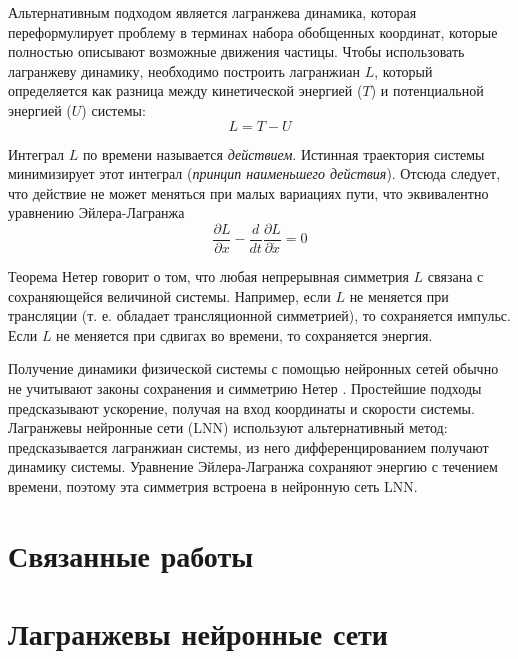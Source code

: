 \documentclass[12pt]{article}
\begin{document}
	Альтернативным подходом является лагранжева динамика, которая переформулирует  проблему в терминах набора обобщенных координат, которые полностью описывают возможные движения частицы. Чтобы использовать лагранжеву динамику, необходимо построить лагранжиан $L$, который определяется как разница между кинетической энергией ($T$) и потенциальной энергией ($U$) системы:
	$$L = T - U $$
	
	Интеграл $L$ по времени называется \textit{действием}. Истинная траектория системы минимизирует этот интеграл (\textit{принцип наименьшего действия}). Отсюда следует, что действие не может меняться при малых вариациях пути, что эквивалентно уравнению Эйлера-Лагранжа
	$$
	\frac{\partial L}{\partial x}-\frac{d}{d t} \frac{\partial L}{\partial \dot{x}}=0
	$$
	
	Теорема Нетер говорит о том, что любая непрерывная симметрия $L$ связана с сохраняющейся величиной системы. Например, если $L$ не меняется при трансляции (т. е. обладает трансляционной симметрией), то сохраняется импульс. Если $L$ не меняется при сдвигах во времени, то сохраняется энергия.
	
	Получение динамики физической системы с помощью нейронных сетей обычно не учитывают законы сохранения и симметрию Нетер \cite{NEURIPS2019_26cd8eca, NEURIPS2019_26cd8eca, NEURIPS2019_26cd8eca}. Простейшие подходы предсказывают ускорение, получая на вход координаты и скорости системы. Лагранжевы нейронные сети (LNN) используют альтернативный метод: предсказывается лагранжиан системы, из него дифференцированием получают динамику системы. Уравнение Эйлера-Лагранжа сохраняют энергию с течением времени, поэтому эта симметрия встроена в нейронную сеть LNN.
	
	\section{Связанные работы}
	
	
	\section{Лагранжевы нейронные сети}
\end{document}
